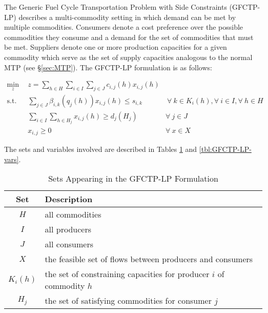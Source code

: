 
The Generic Fuel Cycle Transportation Problem with Side Constraints (GFCTP-LP)
describes a multi-commodity setting in which demand can be met by multiple
commodities. Consumers denote a cost preference over the possible commodities
they consume and a demand for the set of commodities that must be met. Suppliers
denote one or more production capacities for a given commodity which serve as
the set of supply capacities analogous to the normal MTP
(see \S\ref{sec:MTP}). The GFCTP-LP formulation is as follows:

\begin{subequations}\label{eqs:GFCTP-LP}
  \begin{align}
    \min_{z} \:\: & 
    z = \sum_{h \in H}\sum_{i \in I}\sum_{j \in J}c_{i,j}(h) x_{i,j}(h) 
    & \label{eq:GFCTP-LP_obj} \\
    \text{s.t.} \:\: &
    \sum_{j \in J}\beta_{i,k}(q_{j}(h)) x_{i,j}(h) \leq s_{i,k} 
    &
    \: \forall \: k \in K_{i}(h),  
    \forall \: i \in I, \forall \: h \in H \label{eq:GFCTP-LP_sup} \\
    &
    \sum_{i \in I}\sum_{h \in H_{j}} x_{i,j}(h) \geq d_{j}(H_{j}) 
    & 
    \forall \: j \in J \label{eq:GFCTP-LP_dem} \\
    &
    x_{i,j} \geq 0
    &
    \forall \: x \in X \label{eq:GFCTP-LP_x}
  \end{align}
\end{subequations}

The sets and variables involved are described in Tables \ref{tbl:GFCTP-LP-sets}
and \ref{tbl:GFCTP-LP-vars}.

\begin{table} [h!]
\centering
\begin{tabularx}{\textwidth-20pt}{|c|X|} %
\hline
Set         & Description \\
\hline
$H$         & all commodities  \\
$I$         & all producers  \\
$J$         & all consumers  \\
$X$         & the feasible set of flows between producers and consumers  \\
$K_{i}(h)$  & the set of constraining capacities for 
            producer $i$ of commodity $h$  \\
$H_{j}$     & the set of satisfying commodities for consumer $j$  \\
\hline
\end{tabularx}
\caption{Sets Appearing in the GFCTP-LP Formulation}
\label{tbl:GFCTP-LP-sets}
\end{table}

